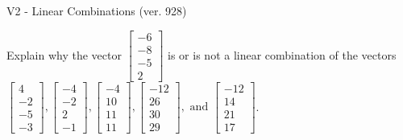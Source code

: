 \begin{exercise}
  \begin{exerciseTitle}V2 - Linear Combinations (ver. 928)\end{exerciseTitle}
  \begin{exerciseStatement}
    Explain why the vector \(\left[\begin{array}{c}
-6 \\
-8 \\
-5 \\
2
\end{array}\right]\)  is or is not a linear 
	combination of the vectors \(\left[\begin{array}{c}
4 \\
-2 \\
-5 \\
-3
\end{array}\right] , \left[\begin{array}{c}
-4 \\
-2 \\
2 \\
-1
\end{array}\right] , \left[\begin{array}{c}
-4 \\
10 \\
11 \\
11
\end{array}\right] , \left[\begin{array}{c}
-12 \\
26 \\
30 \\
29
\end{array}\right] , \text{ and } \left[\begin{array}{c}
-12 \\
14 \\
21 \\
17
\end{array}\right]\).
	



\end{exerciseStatement}
\end{exercise}
